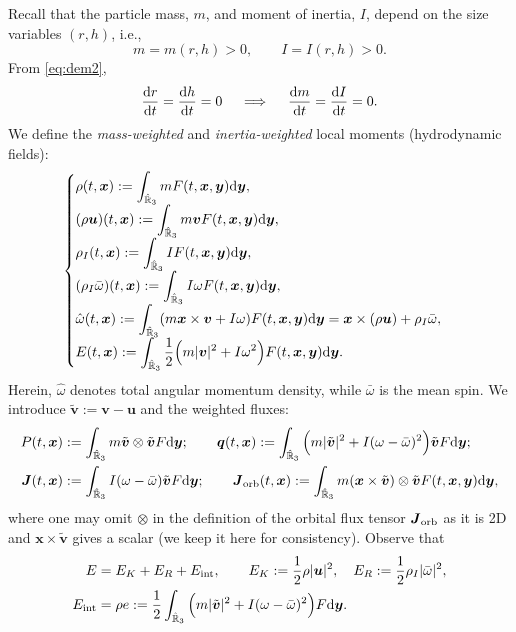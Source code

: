 \documentclass[a4paper,11pt]{article}
\numberwithin{equation}{section}
\theoremstyle{definition}
\newcommand{\bfs}[1]{{\boldsymbol #1}}
\newcommand{\bfx}{\boldsymbol{x}}
\newcommand{\bfy}{\boldsymbol{y}}
\newcommand{\bfv}{\boldsymbol{v}}
\newcommand{\bfuu}{\boldsymbol{u}}
\newcommand{\bbr}{\mathbb R}
\def\d{{  \rm d}}
\begin{document}
Recall that the particle mass, $m$, and moment of inertia, $I$, depend on the size variables $(r,h)$, i.e.,
\[
m=m(r,h)>0,\qquad I=I(r,h)>0.
\]
From \eqref{eq:dem2}, 
\[
\frac{\d r}{\d t} = \frac{\d h}{\d t} = 0\quad\implies\quad \frac{\d m}{\d t}=\frac{\d I}{\d t}=0.
\]
We define the \emph{mass-weighted} and \emph{inertia-weighted} local moments (hydrodynamic fields):
\begin{equation}\label{eq:hlocmom}
\begin{cases}
\displaystyle \rho(t,\bfx) := \int_{\hat{\bbr}_3} m F(t,\bfx,\bfy) \d\bfy,\\[0.18cm]
\displaystyle (\rho \bfuu)(t,\bfx) := \int_{\hat{\bbr}_3} m \bfv F(t,\bfx,\bfy) \d\bfy,\\[0.18cm]
\displaystyle \rho_I(t,\bfx) := \int_{\hat{\bbr}_3} I F(t,\bfx,\bfy) \d\bfy,\\[0.18cm]
\displaystyle (\rho_I\bar\omega)(t,\bfx) := \int_{\hat{\bbr}_3} I \omega F(t,\bfx,\bfy) \d\bfy,\\[0.18cm]
\displaystyle \hat\omega(t,\bfx) := \int_{\hat{\bbr}_3} (m \bfx \times \bfv +I \omega) F(t,\bfx,\bfy) \d\bfy = \bfx \times (\rho \bfuu) + \rho_I \bar\omega,\\[0.18cm]
\displaystyle E(t,\bfx) := \int_{\hat{\bbr}_3} 
\frac12\Big(m|\bfv|^2+I\omega^2\Big) F(t,\bfx,\bfy) \d\bfy.
\end{cases}
\end{equation}
%
Herein, 
$\hat\omega$ denotes total angular momentum density, while $\bar\omega$ is the mean spin.
\noindent
We introduce $\tilde{\bfv}:=\bfv-\bfuu$ and the weighted fluxes:
\begin{equation}\label{eq:hflux}
\begin{aligned}
P(t,\bfx) & :=\int_{\hat{\bbr}_3} m \tilde{\bfv}\otimes\tilde{\bfv} F \d\bfy;\qquad
\bfs{q}(t,\bfx):=\int_{\hat{\bbr}_3}\Big(m|\tilde{\bfv}|^2+I(\omega-\bar\omega)^2\Big) \tilde{\bfv} F \d\bfy; \\
\bfs{J}(t,\bfx) &:=\int_{\hat{\bbr}_3} I (\omega-\bar\omega) \tilde{\bfv} F \d\bfy;
\qquad \bfs{J}_{\rm orb}(t,\bfx)
:=\int_{\hat{\bbr}_3} m (\bfx\times\tilde{\bfv})\otimes \tilde{\bfv}  F(t,\bfx,\bfy) \d\bfy,
\end{aligned}
\end{equation}
where one may omit $\otimes$ in the definition of the orbital flux tensor $\bfs{J}_{\rm orb}$ as it is 2D and $\bfx\times\tilde{\bfv}$ gives a scalar (we keep it here for consistency). 
Observe that
\begin{equation}\label{eq:hdenergy}
\begin{aligned}
E & =E_K+E_R+E_{\rm int},
\qquad
E_K:=\frac12\rho|\bfuu|^2,\quad
E_R:=\frac12\rho_I|\bar\omega|^2,\\
E_{\rm int} & = \rho e := \frac12\int_{\hat{\bbr}_3}\Big(m|\tilde{\bfv}|^2+I(\omega-\bar\omega)^2\Big)F \d\bfy.
\end{aligned}
\end{equation}
\end{document}
